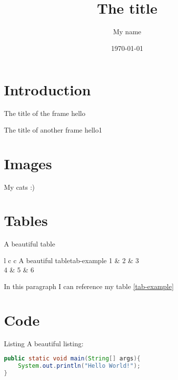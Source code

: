 \documentclass[aspectratio=169]{beamer}
\title{The title}
\author{My name}
\date{\today}
\begin{document}
\titleframe

\section{Introduction}

\begin{frame}{The title of the frame}
	hello
\end{frame}


\begin{frame}{The title of another frame}
	hello1
\end{frame}

\section{Images}

\begin{frame}{My cats :)}
	\begin{center}
	\end{center}

\end{frame}


\section{Tables}

\begin{frame}{A beautiful table}

	\begin{customtable}{l c c }{A beautiful table}{tab-example}
		1 & 2 & 3 \\
		4 & 5 & 6 \\
	\end{customtable}

	In this paragraph I can reference my table \ref{tab-example}

\end{frame}

\section{Code}

\begin{frame}[fragile]{Listing}
	\large
	A beautiful listing:

\begin{lstlisting}[language=Java]
public static void main(String[] args){
	System.out.println("Hello World!");
}
\end{lstlisting}

\end{frame}
\end{document}
